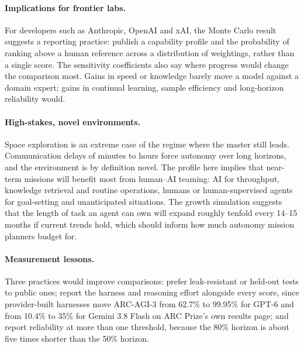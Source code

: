 \documentclass[11pt]{article}
\begin{document}
\paragraph{Implications for frontier labs.} For developers such as Anthropic, OpenAI and xAI, the Monte Carlo result suggests a reporting practice: publish a capability profile and the probability of ranking above a human reference across a distribution of weightings, rather than a single score. The sensitivity coefficients also say where progress would change the comparison most. Gains in speed or knowledge barely move a model against a domain expert; gains in continual learning, sample efficiency and long-horizon reliability would.

\paragraph{High-stakes, novel environments.} Space exploration is an extreme case of the regime where the master still leads. Communication delays of minutes to hours force autonomy over long horizons, and the environment is by definition novel. The profile here implies that near-term missions will benefit most from human--AI teaming: AI for throughput, knowledge retrieval and routine operations, humans or human-supervised agents for goal-setting and unanticipated situations. The growth simulation suggests that the length of task an agent can own will expand roughly tenfold every 14--15 months if current trends hold, which should inform how much autonomy mission planners budget for.

\paragraph{Measurement lessons.} Three practices would improve comparisons: prefer leak-resistant or held-out tests to public ones; report the harness and reasoning effort alongside every score, since provider-built harnesses move ARC-AGI-3 from 62.7\% to 99.95\% for GPT-6 and from 10.4\% to 35\% for Gemini 3.8 Flash on ARC Prize's own results page; and report reliability at more than one threshold, because the 80\% horizon is about five times shorter than the 50\% horizon.
\end{document}
